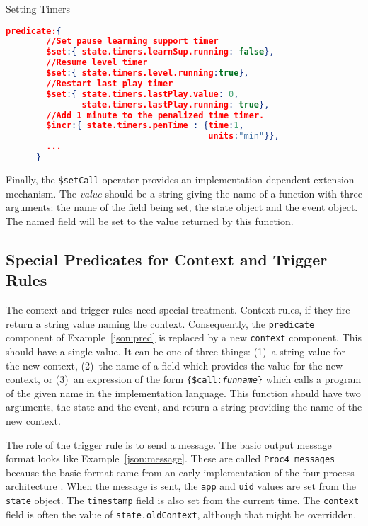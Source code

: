 \documentclass{article}
\begin{document}
  \begin{algorithm}
    \caption{Setting Timers}
    \label{json:time}
    \begin{lstlisting}[language=json]
      predicate:{
        //Set pause learning support timer
        $set:{ state.timers.learnSup.running: false},
        //Resume level timer
        $set:{ state.timers.level.running:true},
        //Restart last play timer
        $set:{ state.timers.lastPlay.value: 0,
               state.timers.lastPlay.running: true},
        //Add 1 minute to the penalized time timer.
        $incr:{ state.timers.penTime : {time:1,
                                        units:"min"}},
        ...
      }
    \end{lstlisting}
  \end{algorithm}
  
  Finally, the \texttt{\$setCall} operator provides an implementation
  dependent extension mechanism.  The \textit{value} should be a
  string giving the name of a function with three arguments:  the name
  of the field being set, the state object and the event object.  The
  named field will be set to the value returned by this function.

  \subsection{Special Predicates for Context and Trigger Rules}
  \label{sub:specRule}

  The context and trigger rules need special treatment.  Context
  rules, if they fire return a string value naming the context.
  Consequently, the \texttt{predicate} component of
  Example~\ref{json:pred} is replaced by a new \texttt{context}
  component.  This should have a single value.  It can be one of three
  things:  (1)~a string value for the new context, (2)~the name of a
  field which provides the value for the new context, or (3)~an
  expression of the form \texttt{\{\$call:\textit{funname}\}} which
  calls a program of the given name in the implementation language.
  This function should have two arguments, the state and the event,
  and return a string providing the name of the new context.
  
  The role of the trigger rule is to send a message.  The basic output
  message format looks like Example~\ref{json:message}.  These are
  called \texttt{Proc4 messages} because the basic format came from an
  early implementation of the four process architecture \cite{Proc4}.
  When the message is sent, the \texttt{app} and \texttt{uid} values
  are set from the \texttt{state} object.  The \texttt{timestamp}
  field is also set from the current time.  The \texttt{context} field
  is often the value of \texttt{state.oldContext}, although that might
  be overridden.
\end{document}
